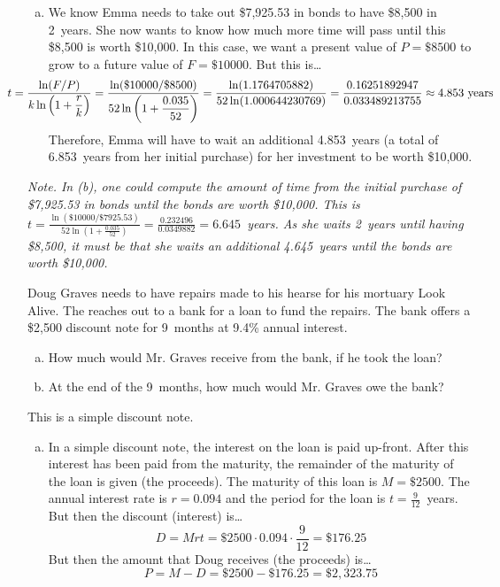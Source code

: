 \documentclass[12pt,letterpaper]{exam}
\begin{document}
\begin{questions}
\begin{enumerate}[(a)]
\item We know Emma needs to take out \$7,925.53 in bonds to have \$8,500 in 2~years. She now wants to know how much more time will pass until this \$8,500 is worth \$10,000. In this case, we want a present value of $P= \$8500$ to grow to a future value of $F= \$10000$. But this is\dots
	\[
	\hspace{-1.3cm} t= \dfrac{\ln(F/P)}{k \ln \left(1 + \dfrac{r}{k} \right)}= \dfrac{\ln(\$10000/\$8500)}{52 \ln \left(1 + \dfrac{0.035}{52} \right)}= \dfrac{\ln(1.1764705882)}{52 \ln(1.000644230769)}= \dfrac{0.16251892947}{0.033489213755} \approx 4.853 \text{ years}
	\]
Therefore, Emma will have to wait an additional 4.853~years (a total of 6.853~years from her initial purchase) for her investment to be worth \$10,000. 
\end{enumerate}

\vfill

{\scriptsize\itshape Note. In (b), one could compute the amount of time from the initial purchase of \$7,925.53 in bonds until the bonds are worth \$10,000. This is $t= \frac{\ln(\$10000/\$7925.53)}{52 \ln \left(1 + \frac{0.035}{52} \right)}= \frac{0.232496}{0.0349882}= 6.645$~years. As she waits 2~years until having \$8,500, it must be that she waits an additional 4.645~years until the bonds are worth \$10,000.}



\newpage
\question[15] Doug Graves needs to have repairs made to his hearse for his mortuary Look Alive. The reaches out to a bank for a loan to fund the repairs. The bank offers a \$2,500 discount note for 9~months at 9.4\% annual interest.
	\begin{enumerate}[(a)]
	\item How much would Mr. Graves receive from the bank, if he took the loan?
	\item At the end of the 9~months, how much would Mr. Graves owe the bank?
	\end{enumerate} \pspace

\sol This is a simple discount note. 
\begin{enumerate}[(a)]
\item In a simple discount note, the interest on the loan is paid up-front. After this interest has been paid from the maturity, the remainder of the maturity of the loan is given (the proceeds). The maturity of this loan is $M= \$2500$. The annual interest rate is $r= 0.094$ and the period for the loan is $t= \frac{9}{12}$~years. But then the discount (interest) is\dots
	\[
	D= Mrt= \$2500 \cdot 0.094 \cdot \frac{9}{12}= \$176.25
	\]
But then the amount that Doug receives (the proceeds) is\dots
	\[
	P= M - D= \$2500 - \$176.25= \$2,\!323.75
	\] \pspace


\end{enumerate}
\end{questions}
\end{document}
